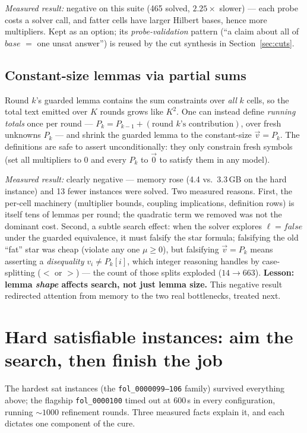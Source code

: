 \documentclass[11pt]{article}
\newcommand{\vv}{\ensuremath{\vec{v}}\xspace}
\newcommand{\vzero}{\ensuremath{\vec{0}}\xspace}
\newcommand{\false}{\ensuremath{\mathit{false}}\xspace}
\begin{document}
\emph{Measured result:} negative on this suite (465 solved, $2.25\times$
slower) --- each probe costs a solver call, and fatter cells have larger
Hilbert bases, hence more multipliers. Kept as an option; its
\emph{probe-validation} pattern (``a claim about all of $\mathit{base}$
$=$ one \textsf{unsat} answer'') is reused by the cut synthesis in
Section~\ref{sec:cuts}.

\subsection{Constant-size lemmas via partial sums}

Round $k$'s guarded lemma contains the sum constraints over \emph{all} $k$
cells, so the total text emitted over $K$ rounds grows like $K^2$. One can
instead define \emph{running totals} once per round ---
$P_k = P_{k-1} + (\text{round } k\text{'s contribution})$, over fresh
unknowns $P_k$ --- and shrink the guarded lemma to the constant-size
$\vv = P_k$. The definitions are safe to assert unconditionally: they only
constrain fresh symbols (set all multipliers to $0$ and every $P_k$ to
$\vzero$ to satisfy them in any model).

\emph{Measured result:} clearly negative --- memory rose (4.4 vs.\
3.3\,GB on the hard instance) and 13 fewer instances were solved. Two
measured reasons. First, the per-cell machinery (multiplier bounds,
coupling implications, definition rows) is itself tens of lemmas per
round; the quadratic term we removed was not the dominant cost. Second, a
subtle search effect: when the solver explores
$\ell = \false$ under the guarded equivalence, it must falsify the star
formula; falsifying the old ``fat'' star was cheap (violate any one
$\mu \ge 0$), but falsifying $\vv = P_k$ means asserting a
\emph{disequality} $v_i \ne P_k[i]$, which integer reasoning handles by
case-splitting ($<$ or $>$) --- the count of those splits exploded
($14 \to 663$). \textbf{Lesson: lemma \emph{shape} affects search, not
just lemma size.} This negative result redirected attention from memory to
the two real bottlenecks, treated next.

\section{Hard satisfiable instances: aim the search, then finish the job}
\label{sec:sat}

The hardest \textsf{sat} instances (the \texttt{fol\_0000099--106}
family) survived everything above; the flagship \texttt{fol\_0000100}
timed out at 600\,s in every configuration, running ${\sim}1000$
refinement rounds. Three measured facts explain it, and each dictates one
component of the cure.
\end{document}
